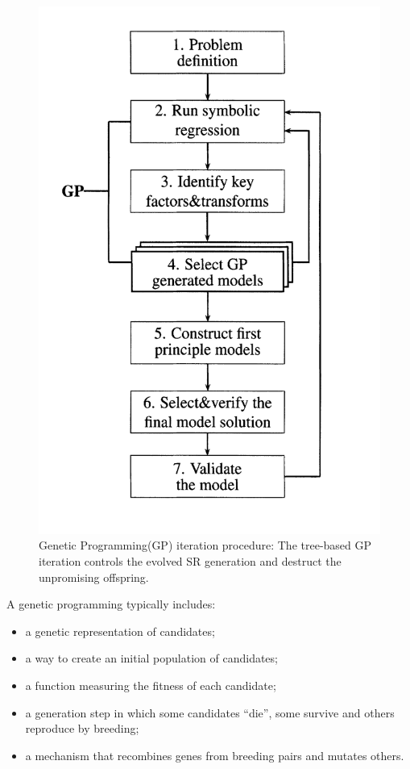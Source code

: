 \documentclass[10pt,journal,compsoc]{IEEEtran}
\begin{document}
\begin{figure}[tb]
	\centering
	\includegraphics[width=\linewidth,clip]{GP_procedure.png}
	\vspace{-2em}
	\caption{Genetic Programming(GP) iteration procedure: The tree-based GP iteration controls the evolved SR generation and destruct the unpromising offspring.}
	\label{fig:GP_procedure.png}
\end{figure}

A genetic programming typically includes:

\begin{itemize}
	\item{a genetic representation of candidates;}
	\item{a way to create an initial population of candidates;}
	\item{a function measuring the fitness of each candidate;}
	\item{a generation step in which some candidates ``die'', some survive and others reproduce by breeding;}
	\item{a mechanism that recombines genes from breeding pairs and mutates others.}
\end{itemize}
\end{document}
